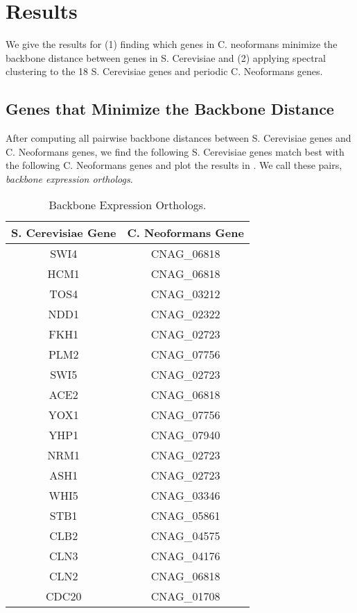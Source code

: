 \section{Results}
We give the results for (1) finding which genes in C. neoformans minimize the backbone distance between genes in S. Cerevisiae and (2) applying spectral clustering to the 18 S. Cerevisiae genes and periodic C. Neoformans genes. 

\subsection{Genes that Minimize the Backbone Distance}
After computing all pairwise backbone distances between S. Cerevisiae genes and C. Neoformans genes, we find the following S. Cerevisiae genes match best with the following C. Neoformans genes and plot the results in . We call these pairs, \emph{backbone expression orthologs}.

\begin{table}[htp]
\centering
\begin{tabular}{|c|c|}
\hline
S. Cerevisiae Gene & C. Neoformans Gene \\ \hline
SWI4 & CNAG\_06818 \\ \hline
HCM1 & CNAG\_06818 \\ \hline
TOS4 & CNAG\_03212 \\ \hline
NDD1 & CNAG\_02322 \\ \hline
FKH1 & CNAG\_02723 \\ \hline
PLM2 & CNAG\_07756 \\ \hline
SWI5 & CNAG\_02723 \\ \hline
ACE2 & CNAG\_06818 \\ \hline
YOX1 & CNAG\_07756 \\ \hline
YHP1 & CNAG\_07940 \\ \hline
NRM1 & CNAG\_02723 \\ \hline
ASH1 & CNAG\_02723 \\ \hline
WHI5 & CNAG\_03346 \\ \hline
STB1 & CNAG\_05861 \\ \hline
CLB2 & CNAG\_04575 \\ \hline
CLN3 & CNAG\_04176 \\ \hline
CLN2 & CNAG\_06818 \\ \hline
CDC20 & CNAG\_01708 \\ \hline
\end{tabular}
\caption{Backbone Expression Orthologs.}
\end{table}

